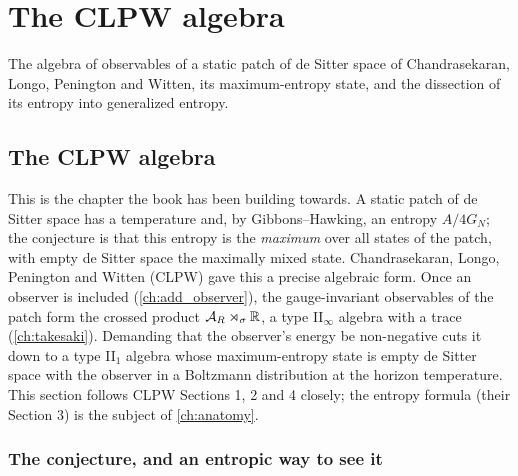 \chapter{The CLPW algebra}\label{ch:clpw_ch}

The algebra of observables of a static patch of de Sitter space of Chandrasekaran, Longo, Penington and Witten, its maximum-entropy state, and the dissection of its entropy into generalized entropy.

\section{The CLPW algebra}\label{ch:clpw}

\begin{physmotiv}
This is the chapter the book has been building towards. A static patch of de Sitter space has a temperature and, by Gibbons--Hawking, an entropy $A/4G_N$; the conjecture is that this entropy is the \emph{maximum} over all states of the patch, with empty de Sitter space the maximally mixed state. Chandrasekaran, Longo, Penington and Witten (CLPW) \cite{CLPW2023} gave this a precise algebraic form. Once an observer is included (\cref{ch:add_observer}), the gauge-invariant observables of the patch form the crossed product $\mathcal{A}_R\rtimes_\sigma\mathbb{R}$, a type II$_\infty$ algebra with a trace (\cref{ch:takesaki}). Demanding that the observer's energy be non-negative cuts it down to a type II$_1$ algebra whose maximum-entropy state is empty de Sitter space with the observer in a Boltzmann distribution at the horizon temperature. This section follows CLPW Sections 1, 2 and 4 closely; the entropy formula (their Section 3) is the subject of \cref{ch:anatomy}.
\end{physmotiv}

\subsection{The conjecture, and an entropic way to see it}

